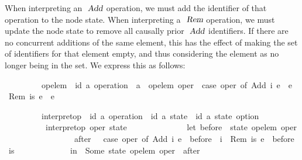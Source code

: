When interpreting an $\isa{Add}$ operation, we must add the identifier of that operation to the node state.
When interpreting a $\isa{Rem}$ operation, we must update the node state to remove all causally prior $\isa{Add}$ identifiers.
If there are no concurrent additions of the same element, this has the effect of making the set of identifiers for that element empty, and thus considering the element as no longer being in the set.
We express this as follows:
\vspace{0.275em}
\begin{isabellebody}
\ \ \ \ \ \ \ \ \ op{\isacharunderscore}elem\ {\isacharcolon}{\isacharcolon}\ {\isachardoublequoteopen}{\isacharparenleft}{\isacharprime}id{\isacharcomma}\ {\isacharprime}a{\isacharparenright}\ operation\ {\isasymRightarrow}\ {\isacharprime}a{\isachardoublequoteclose}\ \ {\isachardoublequoteopen}op{\isacharunderscore}elem\ oper\ {\isasymequiv}\ case\ oper\ of\ Add\ i\ e\ {\isasymRightarrow}\ e\ {\isacharbar}\ Rem\ is\ e\ {\isasymRightarrow}\ e{\isachardoublequoteclose}
\end{isabellebody}
\vspace{0.275em}
\begin{isabellebody}
\ \ \ \ \ \ \ \ \ interpret{\isacharunderscore}op\ {\isacharcolon}{\isacharcolon}\ {\isachardoublequoteopen}{\isacharparenleft}{\isacharprime}id{\isacharcomma}\ {\isacharprime}a{\isacharparenright}\ operation\ {\isasymRightarrow}\ {\isacharparenleft}{\isacharprime}id{\isacharcomma}\ {\isacharprime}a{\isacharparenright}\ state\ {\isasymRightarrow}\ {\isacharparenleft}{\isacharprime}id{\isacharcomma}\ {\isacharprime}a{\isacharparenright}\ state\ option{\isachardoublequoteclose}\ \isanewline
\ \ \ \ \ \ \ \ \ \ {\isachardoublequoteopen}interpret{\isacharunderscore}op\ oper\ state\ {\isasymequiv}\isanewline
\ \ \ \ \ \ \ \ \ \ \ \ \ let\ before\ {\isacharequal}\ state\ {\isacharparenleft}op{\isacharunderscore}elem\ oper{\isacharparenright}{\isacharsemicolon}\isanewline
\ \ \ \ \ \ \ \ \ \ \ \ \ \ \ \ \ after\ \ {\isacharequal}\ case\ oper\ of\ Add\ i\ e\ {\isasymRightarrow}\ before\ {\isasymunion}\ {\isacharbraceleft}i{\isacharbraceright}\ {\isacharbar}\ Rem\ is\ e\ {\isasymRightarrow}\ before\ {\isacharminus}\ is\isanewline
\ \ \ \ \ \ \ \ \ \ \ \ \ in\ \ Some\ {\isacharparenleft}state\ {\isacharparenleft}{\isacharparenleft}op{\isacharunderscore}elem\ oper{\isacharparenright}\ {\isacharcolon}{\isacharequal}\ after{\isacharparenright}{\isacharparenright}{\isachardoublequoteclose}
\end{isabellebody}
\vspace{0.275em}

